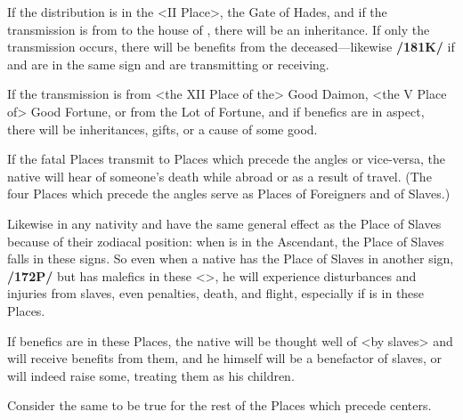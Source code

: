 If the distribution is in the <II Place>, the Gate of Hades, and if the transmission is from \Saturn\xspace to the house of \Jupiter, there will be an inheritance. If only
the transmission occurs, there will be benefits from the deceased—likewise \textbf{/181K/} if \Saturn\xspace and \Jupiter\xspace are in the same sign and are transmitting or receiving.

If the transmission is from <the XII Place of the> Good Daimon, <the V Place of> Good Fortune, or from the Lot of Fortune, and if benefics are in aspect, there will be inheritances, gifts, or a cause of some good. 

If the fatal Places transmit to Places which precede the angles or vice-versa, the native will hear of someone’s death while abroad or as a result of travel. (The four Places which precede the angles serve as Places of Foreigners and of Slaves.)

 Likewise in any nativity \Gemini\xspace and \Sagittarius\xspace have the same general effect as the Place of Slaves because of their zodiacal position: when \Cancer\xspace is in the Ascendant, the Place of Slaves falls in these signs. So even when a native has the Place of Slaves in another sign, \textbf{/172P/} but has malefics in these <\Gemini\xspace [or] \Sagittarius>, he will experience disturbances and injuries from slaves, even penalties, death, and flight, especially if \Saturn\xspace is in these Places. 
 
 If benefics are in these Places, the native will be thought well of <by slaves> and will receive benefits from them, and he himself will be a benefactor of slaves, or will indeed raise some, treating them as his children.
 
Consider the same to be true for the rest of the Places which precede centers.

\newpage